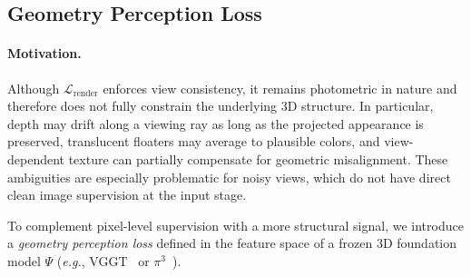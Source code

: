 \subsection{Geometry Perception Loss}
\label{sec:geo_loss}

\paragraph{Motivation.}
Although $\mathcal{L}_{\mathrm{render}}$ enforces view consistency, it remains photometric in nature and therefore does not fully constrain the underlying 3D structure. In particular, depth may drift along a viewing ray as long as the projected appearance is preserved, translucent floaters may average to plausible colors, and view-dependent texture can partially compensate for geometric misalignment. These ambiguities are especially problematic for noisy views, which do not have direct clean image supervision at the input stage.

To complement pixel-level supervision with a more structural signal, we introduce a \emph{geometry perception loss} defined in the feature space of a frozen 3D foundation model $\Psi$ (\textit{e.g.}, VGGT~\citep{wang2025vggt} or $\pi^3$~\citep{wang2025pi}).

